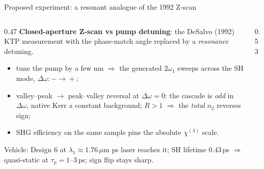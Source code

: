 \documentclass[aspectratio=169,10pt]{beamer}
\newcommand{\chithree}{\chi^{(3)}}
\newcommand{\Dom}{\Delta\omega}
\begin{document}
\begin{frame}{Proposed experiment: a resonant analogue of the 1992 Z-scan}
  \begin{columns}[T]
    \begin{column}{0.47\linewidth}
      \footnotesize
      \textbf{Closed-aperture Z-scan vs pump detuning}: the DeSalvo (1992) KTP
      measurement with the phase-match angle replaced by a \emph{resonance} detuning.
      \begin{itemize}\setlength\itemsep{2pt}
        \item tune the pump by a few nm $\Rightarrow$ the generated $2\omega_1$ sweeps
              across the SH mode, $\Dom: -\!\to\!+$;
        \item valley--peak $\to$ peak--valley reversal at $\Dom=0$: the cascade is
              \emph{odd} in $\Dom$, native Kerr a constant background;
              $R>1$ $\Rightarrow$ the \emph{total} $n_2$ reverses sign;
        \item SHG efficiency on the same sample pins the absolute $\chithree$ scale.
      \end{itemize}
      \begin{block}{Vehicle: \textcolor{d6}{Design 6} at $\lambda_1\approx1.76\,\mu$m}
        ps laser reaches it; SH lifetime $0.43$\,ps $\Rightarrow$ quasi-static at
        $\tau_p=1$--3\,ps; sign flip stays sharp.
      \end{block}
\end{column}
    \begin{column}{0.53\linewidth}
      \centering
\end{column}
\end{columns}
\end{frame}
\end{document}
